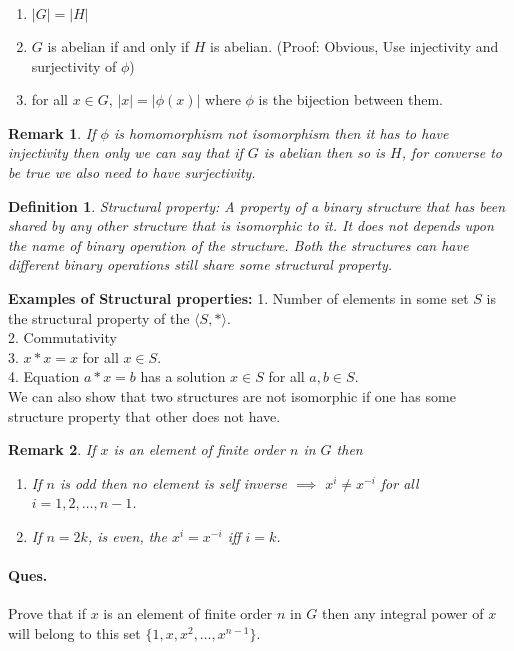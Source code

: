 \documentclass[12pt]{report}
\newtheorem{defn}{Definition}
\newtheorem*{rem}{Remark}
\begin{document}
\begin{enumerate}
    \item $|G| = |H|$
    \item $G$ is abelian if and only if $H$ is abelian. (Proof: Obvious, Use injectivity and surjectivity of $\phi$)
    \item for all $x \in G$, $|x| = |\phi(x)|$ where $\phi$ is the bijection between them.
\end{enumerate}
\begin{rem}
    If $\phi$ is homomorphism not isomorphism then it has to have injectivity then only we can say that if $G$ is abelian then so is $H$, for converse to be true we also need to have surjectivity.
\end{rem}
\begin{defn}
    Structural property: A property of a binary structure that has been shared by any other structure that is isomorphic to it. It does not depends upon the name of binary operation of the structure. Both the structures can have different binary operations still share some structural property.
\end{defn}
\textbf{Examples of Structural properties: }
1. Number of elements in some set $S$ is the structural property of the $\langle S, * \rangle$.\\
2. Commutativity\\
3. $x * x = x$ for all $x \in S$.\\
4. Equation $a * x = b$ has a solution $x \in S$ for all $a,b \in S$.\\ 
We can also show that two structures are not isomorphic if one has some structure property that other does not have.
\begin{rem}
    If $x$ is an element of finite order $n$ in $G$ then
    \begin{enumerate}
        \item If $n$ is odd then no element is self inverse $\implies$ $x^i \neq x^{-i}$ for all $i = 1,2,\dots,n-1$.
        \item If $n = 2k$, is even, the $x^i = x^{-i}$ iff $i = k$.
    \end{enumerate}
\end{rem}
\paragraph*{Ques. }Prove that if $x$ is an element of finite order $n$ in $G$ then any integral power of $x$ will belong to this set $\{1, x, x^2, \dots, x^{n-1}\}$.
\end{document}
